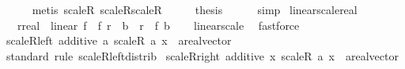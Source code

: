 \begin{isabellebody}
\ \ \ \ \isamarkupfalse%
\ {\isacharparenleft}{\kern0pt}metis\ scaleR{\isacharunderscore}{\kern0pt}{}\ scaleR{\isacharunderscore}{\kern0pt}scaleR{\isacharparenright}{\kern0pt}\isanewline
\ \ \isamarkupfalse%
\ \isamarkupfalse%
\ {\isacharquery}{\kern0pt}thesis\isanewline
\ \ \ \ \isamarkupfalse%
\ simp\isanewline
{}\isamarkupfalse%
%
\endisatagproof
{\isafoldproof}%
%
\isadelimproof
\isanewline
%
\endisadelimproof
\isanewline
{}\isamarkupfalse%
\ linear{\isacharunderscore}{\kern0pt}scale{\isacharunderscore}{\kern0pt}real{\isacharcolon}{\kern0pt}\isanewline
\ \ \ r{\isacharcolon}{\kern0pt}{\isacharcolon}{\kern0pt}real\ \ {\isachardoublequoteopen}linear\ f\ {\isasymLongrightarrow}\ f\ {\isacharparenleft}{\kern0pt}r\ {\isacharasterisk}{\kern0pt}\ b{\isacharparenright}{\kern0pt}\ {\isacharequal}{\kern0pt}\ r\ {\isacharasterisk}{\kern0pt}\ f\ b{\isachardoublequoteclose}\isanewline
%
\isadelimproof
\ \ %
\endisadelimproof
%
\isatagproof
{}\isamarkupfalse%
\ linear{\isacharunderscore}{\kern0pt}scale\ \isamarkupfalse%
\ fastforce%
\endisatagproof
{\isafoldproof}%
%
\isadelimproof
\isanewline
%
\endisadelimproof
\isanewline
{}\isamarkupfalse%
\ scaleR{\isacharunderscore}{\kern0pt}left{\isacharcolon}{\kern0pt}\ additive\ {\isachardoublequoteopen}{\isacharparenleft}{\kern0pt}{\isasymlambda}a{\isachardot}{\kern0pt}\ scaleR\ a\ x\ {\isacharcolon}{\kern0pt}{\isacharcolon}{\kern0pt}\ {\isacharprime}{\kern0pt}a{\isacharcolon}{\kern0pt}{\isacharcolon}{\kern0pt}real{\isacharunderscore}{\kern0pt}vector{\isacharparenright}{\kern0pt}{\isachardoublequoteclose}\isanewline
%
\isadelimproof
\ \ %
\endisadelimproof
%
\isatagproof
{}\isamarkupfalse%
\ standard\ {\isacharparenleft}{\kern0pt}rule\ scaleR{\isacharunderscore}{\kern0pt}left{\isacharunderscore}{\kern0pt}distrib{\isacharparenright}{\kern0pt}%
\endisatagproof
{\isafoldproof}%
%
\isadelimproof
\isanewline
%
\endisadelimproof
\isanewline
{}\isamarkupfalse%
\ scaleR{\isacharunderscore}{\kern0pt}right{\isacharcolon}{\kern0pt}\ additive\ {\isachardoublequoteopen}{\isacharparenleft}{\kern0pt}{\isasymlambda}x{\isachardot}{\kern0pt}\ scaleR\ a\ x\ {\isacharcolon}{\kern0pt}{\isacharcolon}{\kern0pt}\ {\isacharprime}{\kern0pt}a{\isacharcolon}{\kern0pt}{\isacharcolon}{\kern0pt}real{\isacharunderscore}{\kern0pt}vector{\isacharparenright}{\kern0pt}{\isachardoublequoteclose}\isanewline
%
\isadelimproof
\ \ %

\end{isabellebody}
